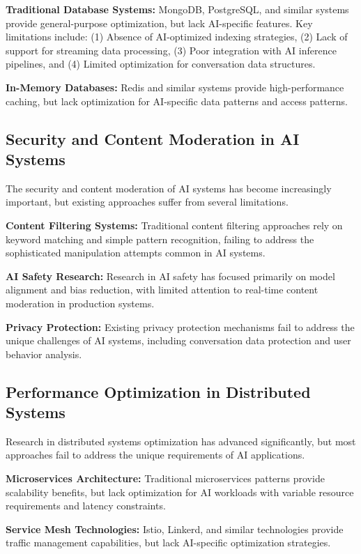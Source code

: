 \documentclass[conference]{IEEEtran}
\begin{document}
\textbf{Traditional Database Systems:} MongoDB, PostgreSQL, and similar systems provide general-purpose optimization, but lack AI-specific features. Key limitations include: (1) Absence of AI-optimized indexing strategies, (2) Lack of support for streaming data processing, (3) Poor integration with AI inference pipelines, and (4) Limited optimization for conversation data structures.

\textbf{In-Memory Databases:} Redis and similar systems provide high-performance caching, but lack optimization for AI-specific data patterns and access patterns.

\subsection{Security and Content Moderation in AI Systems}
The security and content moderation of AI systems has become increasingly important, but existing approaches suffer from several limitations.

\textbf{Content Filtering Systems:} Traditional content filtering approaches rely on keyword matching and simple pattern recognition, failing to address the sophisticated manipulation attempts common in AI systems.

\textbf{AI Safety Research:} Research in AI safety has focused primarily on model alignment and bias reduction, with limited attention to real-time content moderation in production systems.

\textbf{Privacy Protection:} Existing privacy protection mechanisms fail to address the unique challenges of AI systems, including conversation data protection and user behavior analysis.

\subsection{Performance Optimization in Distributed Systems}
Research in distributed systems optimization has advanced significantly, but most approaches fail to address the unique requirements of AI applications.

\textbf{Microservices Architecture:} Traditional microservices patterns provide scalability benefits, but lack optimization for AI workloads with variable resource requirements and latency constraints.

\textbf{Service Mesh Technologies:} Istio, Linkerd, and similar technologies provide traffic management capabilities, but lack AI-specific optimization strategies.
\end{document}

